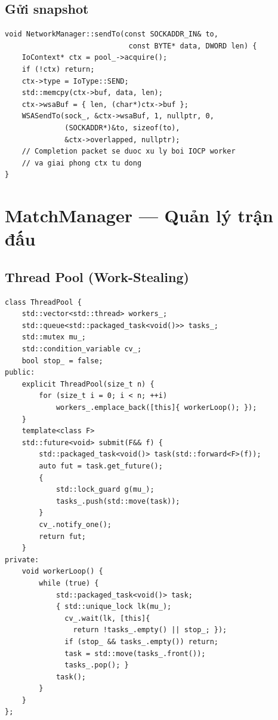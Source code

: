 \documentclass[12pt,a4paper]{report}
\begin{document}
\subsection{Gửi snapshot}

\begin{lstlisting}[style=cppStyle, caption={Gửi S2C\_SNAPSHOT qua IOCP (non-blocking)}, label={lst:send}]
void NetworkManager::sendTo(const SOCKADDR_IN& to,
                             const BYTE* data, DWORD len) {
    IoContext* ctx = pool_->acquire();
    if (!ctx) return;
    ctx->type = IoType::SEND;
    std::memcpy(ctx->buf, data, len);
    ctx->wsaBuf = { len, (char*)ctx->buf };
    WSASendTo(sock_, &ctx->wsaBuf, 1, nullptr, 0,
              (SOCKADDR*)&to, sizeof(to),
              &ctx->overlapped, nullptr);
    // Completion packet se duoc xu ly boi IOCP worker
    // va giai phong ctx tu dong
}
\end{lstlisting}

\section{MatchManager --- Quản lý trận đấu}

\subsection{Thread Pool (Work-Stealing)}

\begin{lstlisting}[style=cppStyle, caption={Triển khai thread pool đơn giản với future}, label={lst:threadpool}]
class ThreadPool {
    std::vector<std::thread> workers_;
    std::queue<std::packaged_task<void()>> tasks_;
    std::mutex mu_;
    std::condition_variable cv_;
    bool stop_ = false;
public:
    explicit ThreadPool(size_t n) {
        for (size_t i = 0; i < n; ++i)
            workers_.emplace_back([this]{ workerLoop(); });
    }
    template<class F>
    std::future<void> submit(F&& f) {
        std::packaged_task<void()> task(std::forward<F>(f));
        auto fut = task.get_future();
        {
            std::lock_guard g(mu_);
            tasks_.push(std::move(task));
        }
        cv_.notify_one();
        return fut;
    }
private:
    void workerLoop() {
        while (true) {
            std::packaged_task<void()> task;
            { std::unique_lock lk(mu_);
              cv_.wait(lk, [this]{
                return !tasks_.empty() || stop_; });
              if (stop_ && tasks_.empty()) return;
              task = std::move(tasks_.front());
              tasks_.pop(); }
            task();
        }
    }
};
\end{lstlisting}
\end{document}
